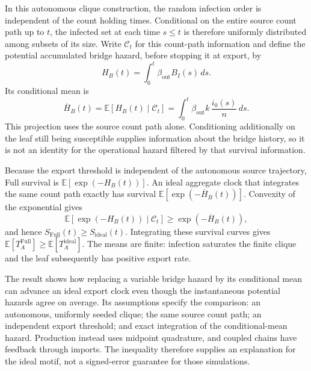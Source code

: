 In this autonomous clique construction, the random infection order is independent of the count holding times. Conditional on the entire source count path up to $t$, the infected set at each time $s\le t$ is therefore uniformly distributed among subsets of its size. Write $\mathcal{C}_t$ for this count-path information and define the potential accumulated bridge hazard, before stopping it at export, by
\[
H_B(t)=\int_0^t\beta_{\mathrm{out}}B_I(s)\,ds.
\]
Its conditional mean is
\[
\overline{H}_B(t)
=\mathbb{E}[H_B(t)\mid\mathcal{C}_t]
=\int_0^t\beta_{\mathrm{out}}k\,\frac{i_0(s)}{n}\,ds.
\]
This projection uses the source count path alone. Conditioning additionally on the leaf still being susceptible supplies information about the bridge history, so it is not an identity for the operational hazard filtered by that survival information.

Because the export threshold is independent of the autonomous source trajectory, Full survival is $\mathbb{E}[\exp(-H_B(t))]$. An ideal aggregate clock that integrates the same count path exactly has survival $\mathbb{E}[\exp(-\overline{H}_B(t))]$. Convexity of the exponential gives
\[
\mathbb{E}\!\left[\exp(-H_B(t))\mid\mathcal{C}_t\right]
\geq \exp(-\overline{H}_B(t)),
\]
and hence $S_{\mathrm{Full}}(t)\ge S_{\mathrm{ideal}}(t)$.
Integrating these survival curves gives
$\mathbb{E}[T_A^{\mathrm{Full}}]\ge\mathbb{E}[T_A^{\mathrm{ideal}}]$.
The means are finite: infection saturates the finite clique and the leaf subsequently has positive export rate.

The result shows how replacing a variable bridge hazard by its conditional mean can advance an ideal export clock even though the instantaneous potential hazards agree on average. Its assumptions specify the comparison: an autonomous, uniformly seeded clique; the same source count path; an independent export threshold; and exact integration of the conditional-mean hazard. Production instead uses midpoint quadrature, and coupled chains have feedback through imports. The inequality therefore supplies an explanation for the ideal motif, not a signed-error guarantee for those simulations.

